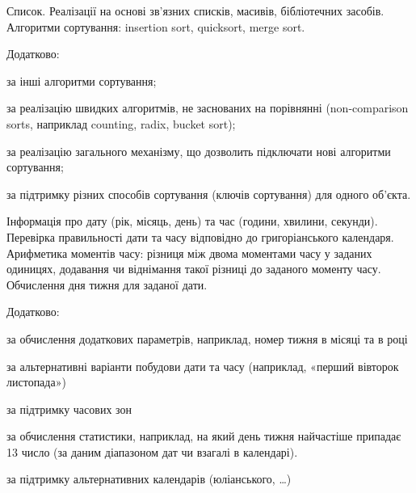 Список. Реалізації на основі зв’язних списків, масивів, бібліотечних засобів. Алгоритми сортування\+: insertion sort, quicksort, merge sort.

Додатково\+:
\begin{DoxyItemize}
\item за інші алгоритми сортування;
\item за реалізацію швидких алгоритмів, не заснованих на порівнянні (non-\/comparison sorts, наприклад counting, radix, bucket sort);
\item за реалізацію загального механізму, що дозволить підключати нові алгоритми сортування;
\item за підтримку різних способів сортування (ключів сортування) для одного об’єкта.
\end{DoxyItemize}

Інформація про дату (рік, місяць, день) та час (години, хвилини, секунди). Перевірка правильності дати та часу відповідно до григоріанського календаря. Арифметика моментів часу\+: різниця між двома моментами часу у заданих одиницях, додавання чи віднімання такої різниці до заданого моменту часу. Обчислення дня тижня для заданої дати.

Додатково\+:
\begin{DoxyItemize}
\item за обчислення додаткових параметрів, наприклад, номер тижня в місяці та в році
\item за альтернативні варіанти побудови дати та часу (наприклад, «перший вівторок листопада»)
\item за підтримку часових зон
\item за обчислення статистики, наприклад, на який день тижня найчастіше припадає 13 число (за даним діапазоном дат чи взагалі в календарі).
\item за підтримку альтернативних календарів (юліанського, …) 
\end{DoxyItemize}